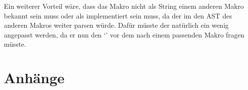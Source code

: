 \begin{enumerate}[ref=\autoref{ssec:Ausblick}: Punkt \arabic*]
        Ein weiterer Vorteil wäre, dass das Makro nicht als String einem anderen Makro bekannt sein muss oder als  implementiert sein muss, da der  im den AST des anderen Makros weiter parsen würde. Dafür müsste der  natürlich ein wenig angepasst werden, da er nun den `' vor dem  nach einem passenden Makro fragen müsste.
    \end{enumerate}


\printbibliography
\listoffigures
\listofmyCodeEnvTypes
{} %


\section*{Anhänge}
\label{sec:Anhänge}


